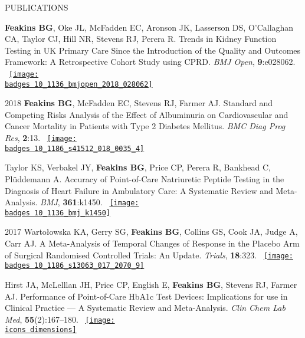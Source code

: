 \documentclass[10pt,a4paper]{article}
\def\badges{./badges/}
\def\icons{./icons/}
\begin{document}
\begin{cvlist}{PUBLICATIONS}
	\item[]
	\textbf{Feakins BG}, Oke JL, McFadden EC, Aronson JK, Lasserson DS, O'Callaghan CA, Taylor CJ, Hill NR, Stevens RJ, Perera R. Trends in Kidney Function Testing in UK Primary Care Since the Introduction of the Quality and Outcomes Framework: A Retrospective Cohort Study using CPRD. \textit{BMJ Open}, \textbf{9}:e028062. ~\href{https://bmj.altmetric.com/details/62023045}{\texttt{[image: \\badges 10\_1136\_bmjopen\_2018\_028062]}}
	
	\item[2018]
	\textbf{Feakins BG}, McFadden EC, Stevens RJ, Farmer AJ. Standard and Competing Risks Analysis of the Effect of Albuminuria on Cardiovascular and Cancer Mortality in Patients with Type 2 Diabetes Mellitus. \textit{BMC Diag Prog Res}, \textbf{2}:13. ~\href{https://biomedcentral.altmetric.com/details/45475518}{\texttt{[image: \\badges 10\_1186\_s41512\_018\_0035\_4]}}
	
	\item[]
	Taylor KS, Verbakel JY, \textbf{Feakins BG}, Price CP, Perera R, Bankhead C, Pl\"uddemann A. Accuracy of Point-of-Care Natriuretic Peptide Testing in the Diagnosis of Heart Failure in Ambulatory Care: A Systematic Review and Meta-Analysis. \textit{BMJ}, \textbf{361}:k1450. ~\href{https://bmj.altmetric.com/details/42193657}{\texttt{[image: \\badges 10\_1136\_bmj\_k1450]}}
	
	\item[2017]
	Warto\l{}owska KA, Gerry SG, \textbf{Feakins BG}, Collins GS, Cook JA, Judge A, Carr AJ. A Meta-Analysis of Temporal Changes of Response in the Placebo Arm of Surgical Randomised Controlled Trials: An Update. \textit{Trials}, \textbf{18}:323. ~\href{https://biomedcentral.altmetric.com/details/21804060}{\texttt{[image: \\badges 10\_1186\_s13063\_017\_2070\_9]}}
	
	\item[]
	Hirst JA, McLelllan JH, Price CP, English E, \textbf{Feakins BG}, Stevens RJ, Farmer AJ. Performance of Point-of-Care HbA1c Test Devices: Implications for use in Clinical Practice --- A Systematic Review and Meta-Analysis. \textit{Clin Chem Lab Med}, \textbf{55}(2):167--180. ~\href{https://badge.dimensions.ai/details/id/pub.1036082624}{\texttt{[image: \\icons dimensions]}}
	

\end{cvlist}
\end{document}
